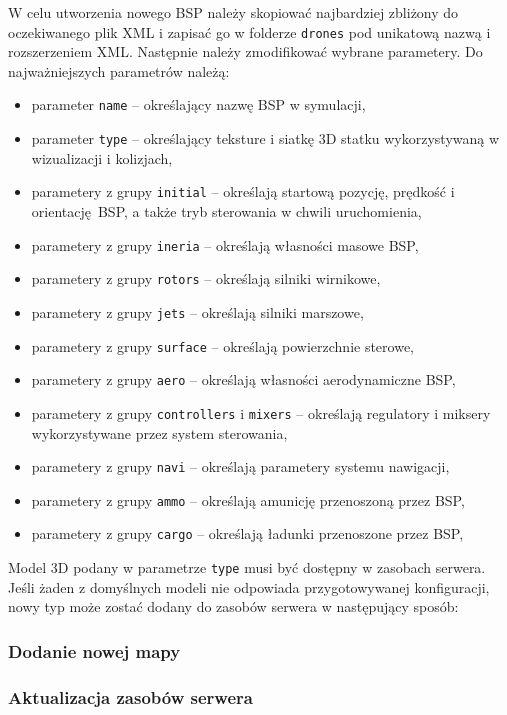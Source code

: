 \documentclass[15pt]{sprawozdanie}
\begin{document}
W celu utworzenia nowego BSP należy skopiować najbardziej zbliżony do oczekiwanego plik XML i zapisać go w folderze \texttt{drones} pod unikatową nazwą i rozszerzeniem XML. Następnie należy zmodifikować wybrane parametery. Do najważniejszych parametrów należą:

 \begin{itemize}[noitemsep]
\item parameter \texttt{name} -- określający nazwę BSP w symulacji,
\item parameter \texttt{type} -- określający teksture i siatkę 3D statku wykorzystywaną w wizualizacji i kolizjach,
\item parametery z grupy \texttt{initial} -- określają startową pozycję, prędkość i orientację BSP, a także tryb sterowania w chwili uruchomienia,
\item parametery z grupy \texttt{ineria} -- określają własności masowe BSP,
\item parametery z grupy \texttt{rotors} -- określają silniki wirnikowe,
\item parametery z grupy \texttt{jets} -- określają silniki marszowe,
\item parametery z grupy \texttt{surface} -- określają powierzchnie sterowe,
\item parametery z grupy \texttt{aero} -- określają własności aerodynamiczne BSP,
\item parametery z grupy \texttt{controllers} i \texttt{mixers} -- określają regulatory i miksery wykorzystywane przez system sterowania,
\item parametery z grupy \texttt{navi} -- określają parametery systemu nawigacji,
\item parametery z grupy \texttt{ammo} -- określają amunicję przenoszoną przez BSP,
\item parametery z grupy \texttt{cargo} -- określają ładunki przenoszone przez BSP,
\end{itemize}

Model 3D podany w parametrze \texttt{type} musi być dostępny w zasobach serwera. Jeśli żaden z domyślnych modeli nie odpowiada przygotowywanej konfiguracji, nowy typ może zostać dodany do zasobów serwera w następujący sposób:

\subsubsection{Dodanie nowej mapy} \label{add_map}

\subsubsection{Aktualizacja zasobów serwera}
\end{document}
